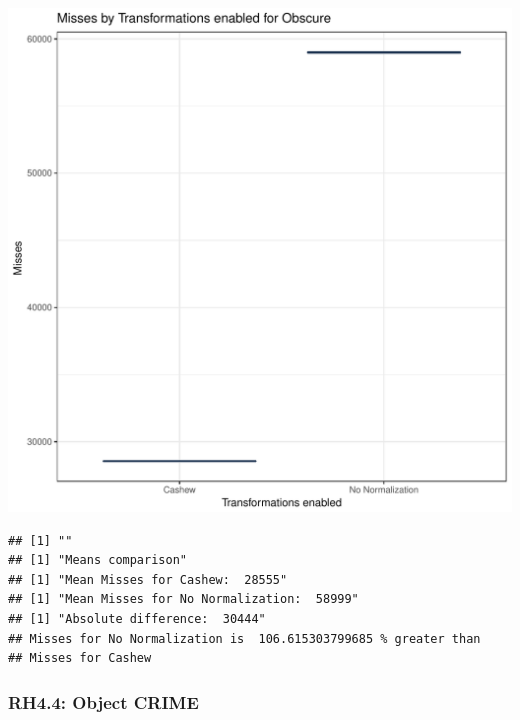 \documentclass{article}\usepackage[]{graphicx}\usepackage[]{color}
\makeatletter
\def\maxwidth{ %
  \ifdim\Gin@nat@width>\linewidth
    \linewidth
  \else
    \Gin@nat@width
  \fi
}
\newenvironment{kframe}{%
 \def\at@end@of@kframe{}%
 \ifinner\ifhmode%
  \def\at@end@of@kframe{\end{minipage}}%
  \begin{minipage}{\columnwidth}%
 \fi\fi%
 \def\FrameCommand##1{\hskip\@totalleftmargin \hskip-\fboxsep
 \colorbox{shadecolor}{##1}\hskip-\fboxsep
     \hskip-\linewidth \hskip-\@totalleftmargin \hskip\columnwidth}%
 \MakeFramed {\advance\hsize-\width
   \@totalleftmargin\z@ \linewidth\hsize
   \@setminipage}}%
 {\par\unskip\endMakeFramed%
 \at@end@of@kframe}
\newenvironment{knitrout}{}{} %
\makeatother
\begin{document}
\begin{knitrout}
\color{fgcolor}
\includegraphics[width=\maxwidth]{figure/RH4_obscure-1} 
\begin{kframe}

{\ttfamily\noindent\bfseries\color{errorcolor}{\#\# Error in eval(expr, envir, enclos): object 'shap\_cashew\_obscure' not found}}\begin{verbatim}
## [1] ""
## [1] "Means comparison"
## [1] "Mean Misses for Cashew:  28555"
## [1] "Mean Misses for No Normalization:  58999"
## [1] "Absolute difference:  30444"
## Misses for No Normalization is  106.615303799685 % greater than 
## Misses for Cashew
\end{verbatim}
\end{kframe}
\end{knitrout}


\subsubsection{RH4.4: Object CRIME}
\end{document}
